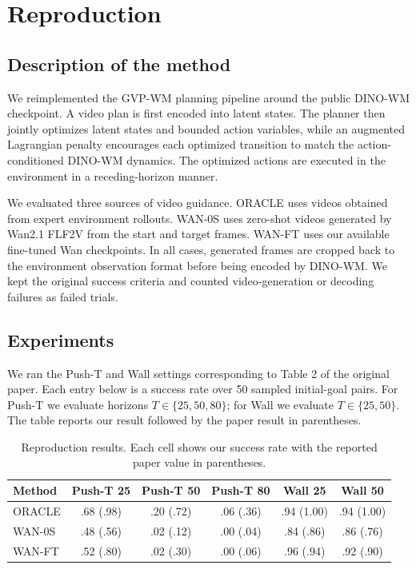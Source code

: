 \section{Reproduction}

\subsection{Description of the method}
We reimplemented the GVP-WM planning pipeline around the public DINO-WM
checkpoint. A video plan is first encoded into latent states. The planner then
jointly optimizes latent states and bounded action variables, while an
augmented Lagrangian penalty encourages each optimized transition to match the
action-conditioned DINO-WM dynamics. The optimized actions are executed in the
environment in a receding-horizon manner.

We evaluated three sources of video guidance. ORACLE uses videos obtained from
expert environment rollouts. WAN-0S uses zero-shot videos generated by Wan2.1
FLF2V from the start and target frames. WAN-FT uses our available fine-tuned Wan
checkpoints. In all cases, generated frames are cropped back to the environment
observation format before being encoded by DINO-WM. We kept the original success
criteria and counted video-generation or decoding failures as failed trials.

\subsection{Experiments}
We ran the Push-T and Wall settings corresponding to Table 2 of the original
paper. Each entry below is a success rate over 50 sampled initial-goal pairs.
For Push-T we evaluate horizons \(T\in\{25,50,80\}\); for Wall we evaluate
\(T\in\{25,50\}\). The table reports our result followed by the paper result in
parentheses.

\begin{table}[h]
\centering
\small
\setlength{\tabcolsep}{4pt}
\begin{tabular}{lccccc}
\toprule
Method & Push-T 25 & Push-T 50 & Push-T 80 & Wall 25 & Wall 50 \\
\midrule
ORACLE & .68 (.98) & .20 (.72) & .06 (.36) & .94 (1.00) & .94 (1.00) \\
WAN-0S & .48 (.56) & .02 (.12) & .00 (.04) & .84 (.86) & .86 (.76) \\
WAN-FT & .52 (.80) & .02 (.30) & .00 (.06) & .96 (.94) & .92 (.90) \\
\bottomrule
\end{tabular}
\caption{Reproduction results. Each cell shows our success rate with the
reported paper value in parentheses.}
\label{tab:reproduction-results}
\end{table}

